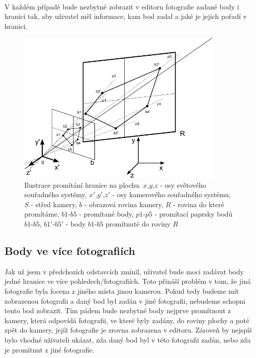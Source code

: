 \documentclass[11pt,twoside,a4paper]{book}
\begin{document}
\paragraph{}
V každém případě bude nezbytné zobrazit v editoru fotografie zadané body i hranici tak, aby uživatel měl informace, kam bod zadal a jaké je jejich pořadí v hranici. 

\begin{figure}[h]
	\begin{center}
		\includegraphics[width=10cm]{ilustrace/Il-10-1}
		\caption{Ilustrace promítání hranice na plochu. $x$,$y$,$z$ - osy světového souřadného systémy, $x'$,$y'$,$z'$ - osy kamerového souřadného systému, $S$ - střed kamery, $b$ - obrazová rovina kamery, $R$ - rovina do které promítáme, $b1$-$b5$ - promítané body, $p1$-$p5$ - promítací paprsky bodů $b1$-$b5$, $b1'$-$b5'$ - body $b1$-$b5$ promítnuté do roviny $R$ }
		\label{fig:10-1}
	\end{center}
\end{figure}

\subsection{Body ve více fotografiích}
Jak už jsem v předchozích odstavcích zmínil, uživatel bude moci zadávat body jedné hranice ve více pohledech/fotografiích.  Toto přináší problém v tom, že jiná fotografie byla focena z jiného místa jinou kamerou. Pokud tedy budeme mít zobrazenou fotografii a daný bod byl zadán v jiné fotografii, nebudeme schopni tento bod zobrazit. Tím pádem bude nezbytné body nejprve promítnout z kamery, která odpovídá fotografii, ve které byly zadány, do roviny plochy a poté zpět do kamery, jejíž fotografie je zrovna zobrazena v editoru. Zároveň by nejspíš bylo vhodné uživateli ukázat, zda daný bod byl v této fotografii zadán, nebo zda je promítnut z jiné fotografie.
\end{document}

